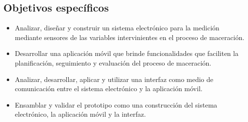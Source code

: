     \subsection{Objetivos específicos}
        \begin{itemize}
            \item Analizar, diseñar y construir un sistema electrónico para la medición mediante sensores de las variables intervinientes en el proceso de maceración.
            
            \item Desarrollar una aplicación móvil que brinde funcionalidades que faciliten la planificación, seguimiento y evaluación del proceso de maceración.
            
            \item Analizar, desarrollar, aplicar y utilizar una interfaz como medio de comunicación entre el sistema electrónico y la aplicación móvil.
            
            \item Ensamblar y validar el prototipo como una construcción del sistema electrónico, la aplicación móvil y la interfaz.
        \end{itemize}
 
 
 
